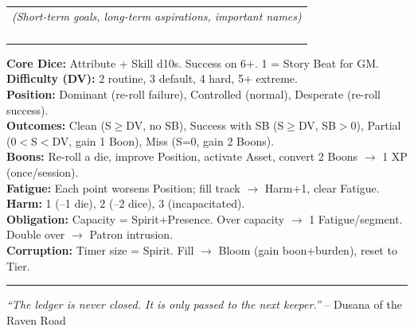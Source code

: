 \begin{tcolorbox}[
    enhanced, sharp corners, 
    colback=white, colframe=black!50, 
    title={\large\bfseries Notes \& Goals}, 
    fonttitle=\bfseries,
    breakable
]
\vspace{2pt}
\begin{tabular}{p{\textwidth}}
\small
\emph{(Short-term goals, long-term aspirations, important names)} \\
\rule{0pt}{4ex}\\
\rule{0pt}{4ex}\\
\rule{0pt}{4ex}\\
\rule{0pt}{4ex}\\
\end{tabular}
\end{tcolorbox}

\begin{tcolorbox}[
    enhanced, sharp corners, 
    colback=gray!5, colframe=black!50, 
    title={\large\bfseries Quick Reference (inside cover)}, 
    fonttitle=\bfseries,
    breakable
]
\small
\textbf{Core Dice:} Attribute + Skill d10s. Success on 6+. 1 = Story Beat for GM.\\
\textbf{Difficulty (DV):} 2 routine, 3 default, 4 hard, 5+ extreme.\\
\textbf{Position:} Dominant (re-roll failure), Controlled (normal), Desperate (re-roll success).\\
\textbf{Outcomes:} Clean (S$\geq$DV, no SB), Success with SB (S$\geq$DV, SB$>$0), Partial (0$<$S$<$DV, gain 1 Boon), Miss (S=0, gain 2 Boons).\\
\textbf{Boons:} Re-roll a die, improve Position, activate Asset, convert 2 Boons $\rightarrow$ 1 XP (once/session).\\
\textbf{Fatigue:} Each point worsens Position; fill track $\rightarrow$ Harm+1, clear Fatigue.\\
\textbf{Harm:} 1 (--1 die), 2 (--2 dice), 3 (incapacitated).\\
\textbf{Obligation:} Capacity = Spirit+Presence. Over capacity $\rightarrow$ 1 Fatigue/segment. Double over $\rightarrow$ Patron intrusion.\\
\textbf{Corruption:} Timer size = Spirit. Fill $\rightarrow$ Bloom (gain boon+burden), reset to Tier.
\end{tcolorbox}

\noindent\rule{\textwidth}{1pt}\smallskip
\noindent \textit{``The ledger is never closed. It is only passed to the next keeper.''} -- Dusana of the Raven Road